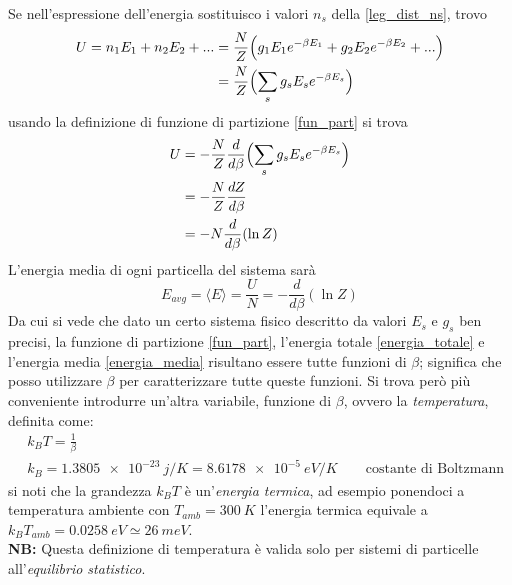 Se nell'espressione dell'energia sostituisco i valori $n_s$ della \ref{leg_dist_ns}, trovo
\begin{equation}
\begin{split}
U = n_1 E_1 + n_2 E_2 + ... & = \frac{ N}{Z } \Bigl(  g_1 E_1 e^{ -\beta E_1 } + g_2 E_2 e^{ -\beta E_2 } + ... \Bigr) \\
& = \frac{ N}{Z } \Bigl(  \sum_s g_s E_s e^{ -\beta E_s }  \Bigr)
\end{split}
\end{equation}
usando la definizione di funzione di partizione \ref{fun_part} si trova
\begin{equation}
\begin{split}
U &= - \frac{ N}{Z } \frac{ d}{d\beta }  \Bigl(  \sum_s g_s E_s e^{ -\beta E_s }  \Bigr) \\
& = - \frac{ N}{Z } \frac{ d Z}{d\beta } \\
& = - N \frac{ d}{d\beta }(\ln Z)
\label{energia_totale}
\end{split}
\end{equation}
L'energia media di ogni particella del sistema sarà
\begin{equation}
E_{avg} =  \langle E \rangle = \frac{ U}{N } = - \frac{ d}{d\beta } (\ln Z)
\label{energia_media}
\end{equation}
Da cui si vede che dato un certo sistema fisico descritto da valori $E_s$ e $g_s$ ben precisi, la funzione di partizione \ref{fun_part}, l'energia totale \ref{energia_totale} e l'energia media \ref{energia_media} risultano essere tutte funzioni di $\beta$;
significa che posso utilizzare $\beta$ per caratterizzare tutte queste funzioni.
Si trova però più conveniente introdurre un'altra variabile, funzione di $\beta$, ovvero la \textit{temperatura}, definita come:
\begin{equation}
\begin{split}
& k_B T = \frac{1}{\beta} \\
& k_B = \SI{1.3805e-23}{j / K} = \SI{8.6178e-5}{eV / K} \quad\quad \mbox{costante di Boltzmann}
\end{split}
\end{equation}
si noti che la grandezza $k_B T$ è un'\textit{energia termica}, ad esempio ponendoci a temperatura ambiente con $T_{amb}=\SI{300}{K}$ l'energia termica equivale a $k_B T_{amb} = \SI{0.0258}{eV} \simeq \SI{26}{m eV} $. \\
\textbf{NB:} Questa definizione di temperatura è valida solo per sistemi di particelle all'\textit{equilibrio statistico}. \\
